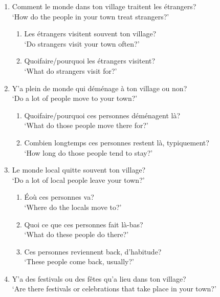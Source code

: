 \begin{enumerate}
        \item Comment le monde dans ton village traitent les étrangers?\\
              `How do the people in your town treat strangers?'
        \begin{enumerate}
            \item Les étrangers visitent souvent ton village?\\
                  `Do strangers visit your town often?'
            \item Quoifaire/pourquoi les étrangers visitent?\\
                  `What do strangers visit for?'
        \end{enumerate}
        \item Y'a plein de monde qui déménage à ton village ou non?\\
              `Do a lot of people move to your town?'
        \begin{enumerate}
            \item Quoifaire/pourquoi ces personnes déménagent là?\\
                  `What do those people move there for?'
            \item Combien longtemps ces personnes restent là, typiquement?\\
                  `How long do those people tend to stay?'
        \end{enumerate}
        \item Le monde local quitte souvent ton village?\\
              `Do a lot of local people leave your town?'
        \begin{enumerate}
            \item Éoù ces personnes va?\\
                  `Where do the locals move to?'
            \item Quoi ce que ces personnes fait là-bas?\\
                  `What do these people do there?'
            \item Ces personnes reviennent back, d'habitude?\\
                  `These people come back, usually?'
        \end{enumerate}
        \item Y'a des festivals ou des fêtes qu'a lieu dans ton village?\\
              `Are there festivals or celebrations that take place in your town?'

\end{enumerate}

